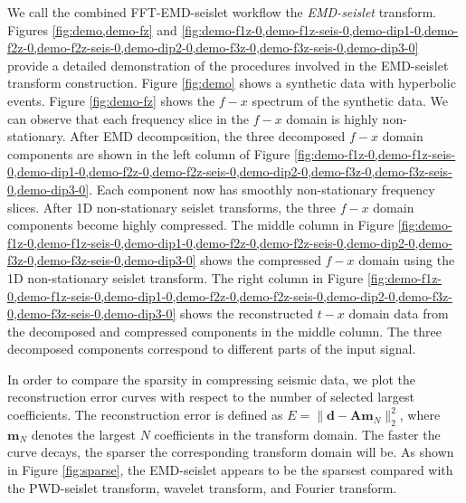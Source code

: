 We call the combined FFT-EMD-seislet workflow the \emph{EMD-seislet} transform. Figures \ref{fig:demo,demo-fz} and \ref{fig:demo-f1z-0,demo-f1z-seis-0,demo-dip1-0,demo-f2z-0,demo-f2z-seis-0,demo-dip2-0,demo-f3z-0,demo-f3z-seis-0,demo-dip3-0} provide a detailed demonstration of the procedures involved in the EMD-seislet transform construction. Figure \ref{fig:demo} shows a synthetic data with hyperbolic events. Figure \ref{fig:demo-fz} shows the $f-x$ spectrum of the synthetic data. We can observe that each frequency slice in the $f-x$ domain is highly non-stationary. After EMD decomposition, the three decomposed $f-x$ domain components are shown in the left column of Figure \ref{fig:demo-f1z-0,demo-f1z-seis-0,demo-dip1-0,demo-f2z-0,demo-f2z-seis-0,demo-dip2-0,demo-f3z-0,demo-f3z-seis-0,demo-dip3-0}. Each component now has smoothly non-stationary frequency slices. After 1D non-stationary seislet transforms, the three $f-x$ domain components become highly compressed. The middle column in Figure \ref{fig:demo-f1z-0,demo-f1z-seis-0,demo-dip1-0,demo-f2z-0,demo-f2z-seis-0,demo-dip2-0,demo-f3z-0,demo-f3z-seis-0,demo-dip3-0} shows the compressed $f-x$ domain using the 1D non-stationary seislet transform. The right column in Figure \ref{fig:demo-f1z-0,demo-f1z-seis-0,demo-dip1-0,demo-f2z-0,demo-f2z-seis-0,demo-dip2-0,demo-f3z-0,demo-f3z-seis-0,demo-dip3-0} shows the reconstructed $t-x$ domain data from the decomposed and compressed components in the middle column. The three decomposed components correspond to different parts of the input signal.%

In order to compare the sparsity in compressing seismic data, we plot the reconstruction error curves with respect to the number of selected largest coefficients. The reconstruction error is defined as $E=\parallel\mathbf{d}-\mathbf{Am}_N\parallel_2^2$, where $\mathbf{m}_N$ denotes the largest $N$ coefficients in the transform domain. The faster the curve decays, the sparser the corresponding transform domain will be. As shown in Figure \ref{fig:sparse}, the EMD-seislet appears to be the sparsest compared with the PWD-seislet transform, wavelet transform, and Fourier transform.



